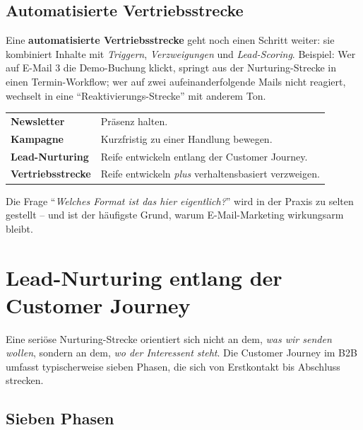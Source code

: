 \documentclass[11pt,a4paper,oneside]{article}
\newcommand{\fachbegriff}[1]{\textbf{#1}}
\begin{document}
\subsection{Automatisierte Vertriebsstrecke}

Eine \fachbegriff{automatisierte Vertriebsstrecke} geht noch einen Schritt weiter: sie kombiniert Inhalte mit \emph{Triggern}, \emph{Verzweigungen} und \emph{Lead-Scoring}. Beispiel: Wer auf E-Mail 3 die Demo-Buchung klickt, springt aus der Nurturing-Strecke in einen Termin-Workflow; wer auf zwei aufeinanderfolgende Mails nicht reagiert, wechselt in eine ``Reaktivierungs-Strecke'' mit anderem Ton.

\begin{merkbox}
\begin{tabularx}{\linewidth}{@{}>{\bfseries}lX@{}}
\toprule
Newsletter & Präsenz halten. \\
Kampagne & Kurzfristig zu einer Handlung bewegen. \\
Lead-Nurturing & Reife entwickeln entlang der Customer Journey. \\
Vertriebsstrecke & Reife entwickeln \emph{plus} verhaltensbasiert verzweigen. \\
\bottomrule
\end{tabularx}
\medskip
\noindent Die Frage ``\emph{Welches Format ist das hier eigentlich?}'' wird in der Praxis zu selten gestellt -- und ist der häufigste Grund, warum E-Mail-Marketing wirkungsarm bleibt.
\end{merkbox}

\section{Lead-Nurturing entlang der Customer Journey}

Eine seriöse Nurturing-Strecke orientiert sich nicht an dem, \emph{was wir senden wollen}, sondern an dem, \emph{wo der Interessent steht}. Die Customer Journey im B2B umfasst typischerweise sieben Phasen, die sich von Erstkontakt bis Abschluss strecken.

\subsection{Sieben Phasen}
\end{document}
